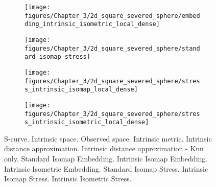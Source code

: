 \documentclass[final,supplement]{siamart1116}
\begin{document}
\begin{figure}[h]
\begin{centering}
\begin{subfigure}[b]{0.32\linewidth}
			\texttt{[image: figures/Chapter\_3/2d\_square\_severed\_sphere/embedding\_intrinsic\_isometric\_local\_dense]}
			\caption{\label{fig:punctured_severed_sphere_intrinsic_isometric_embedding1}}
		\end{subfigure}
	\end{centering}
	\begin{centering}
		\begin{subfigure}[b]{0.32\linewidth}
			\texttt{[image: figures/Chapter\_3/2d\_square\_severed\_sphere/standard\_isomap\_stress]}
			\caption{\label{fig:punctured_severed_sphere_standard_isomap_stress1}}
		\end{subfigure}
		\hfill
		\begin{subfigure}[b]{0.32\linewidth}
			\texttt{[image: figures/Chapter\_3/2d\_square\_severed\_sphere/stress\_intrinsic\_isomap\_local\_dense]}
			\caption{\label{fig:punctured_severed_sphere_intrinsic_isomap_stress1}}
		\end{subfigure}
		\hfill
		\begin{subfigure}[b]{0.32\linewidth}
			\texttt{[image: figures/Chapter\_3/2d\_square\_severed\_sphere/stress\_intrinsic\_isometric\_local\_dense]}
			\caption{\label{fig:punctured_severed_sphere_intrinsic_isometric_stress1}}
		\end{subfigure}
	\end{centering}
	\caption{\label{fig:punctured_severed_sphere1} S-curve. \protect{} Intrinsic space. 
		\protect{} Observed space. 
		\protect{} Intrinsic metric. 
		\protect{} Intrinsic distance approximation.
		\protect{} Intrinsic distance approximation - Knn only.
		\protect{} Standard Isomap Embedding.
		\protect{} Intrinsic Isomap Embedding.
		\protect{} Intrinsic Isometric Embedding.
		\protect{} Standard Isomap Stress.
		\protect{} Intrinsic Isomap Stress.
		\protect{} Intrinsic Isometric Stress.
	}
\end{figure}
\end{document}
